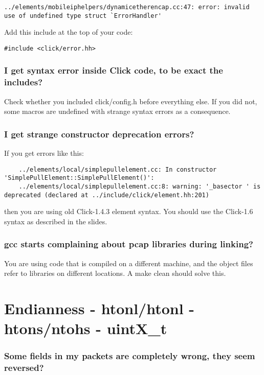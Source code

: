 \documentclass[a4paper]{article}
\begin{document}
\begin{lstlisting}
../elements/mobileiphelpers/dynamicetherencap.cc:47: error: invalid use of undefined type struct `ErrorHandler'
\end{lstlisting}

Add this include at the top of your code:
\begin{lstlisting}
#include <click/error.hh>
\end{lstlisting}

\subsubsection*{I get syntax error inside Click code, to be exact the includes?}

Check whether you included click/config.h before everything else. If you
did not, some macros are undefined with strange syntax errors as a
consequence.

\subsubsection*{I get strange constructor deprecation errors?}

If you get errors like this:
\begin{lstlisting}
	../elements/local/simplepullelement.cc: In constructor 'SimplePullElement::SimplePullElement()':
	../elements/local/simplepullelement.cc:8: warning: '_basector ' is deprecated (declared at ../include/click/element.hh:201)
\end{lstlisting}

then you are using old Click-1.4.3 element syntax. You should use the
Click-1.6 syntax as described in the slides.

\subsubsection*{gcc starts complaining about pcap libraries during linking?}

You are using code that is compiled on a different machine, and the
object files refer to libraries on different locations. A make clean
should solve this.

\section{Endianness - htonl/htonl - htons/ntohs - uintX\_t}

\subsubsection*{Some fields in my packets are completely wrong, they seem reversed?}
\end{document}
